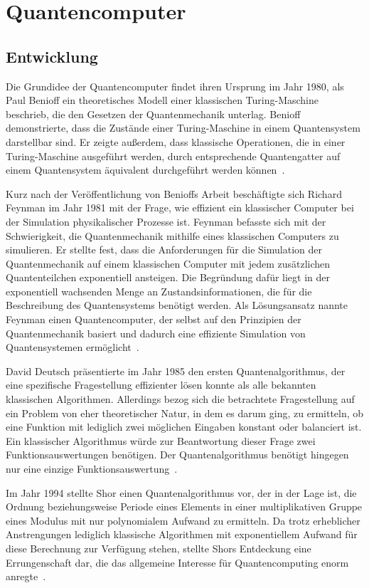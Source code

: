 \section{Quantencomputer}
\subsection{Entwicklung} 
Die Grundidee der Quantencomputer findet ihren Ursprung im Jahr 1980, 
als Paul Benioff ein theoretisches Modell einer klassischen Turing-Maschine beschrieb, 
die den Gesetzen der Quantenmechanik unterlag.
Benioff demonstrierte, dass die Zustände einer Turing-Maschine in einem Quantensystem darstellbar sind. 
Er zeigte außerdem, dass klassische Operationen, die in einer Turing-Maschine ausgeführt werden, 
durch entsprechende Quantengatter auf einem Quantensystem äquivalent durchgeführt werden können~\cite{benioff1980}.

Kurz nach der Veröffentlichung von Benioffs Arbeit beschäftigte sich Richard Feynman im Jahr 1981 mit der Frage,
wie effizient ein klassischer Computer bei der Simulation physikalischer Prozesse ist.
Feynman befasste sich mit der Schwierigkeit, die Quantenmechanik mithilfe eines klassischen Computers zu simulieren.
Er stellte fest, dass die Anforderungen für die Simulation der Quantenmechanik auf einem klassischen Computer mit jedem zusätzlichen Quantenteilchen exponentiell ansteigen.
Die Begründung dafür liegt in der exponentiell wachsenden Menge an Zustandsinformationen,
die für die Beschreibung des Quantensystems benötigt werden.
Als Lösungsansatz nannte Feynman einen Quantencomputer, 
der selbst auf den Prinzipien der Quantenmechanik basiert und dadurch eine effiziente Simulation von Quantensystemen ermöglicht~\cite{Feynman1982}.

David Deutsch präsentierte im Jahr 1985 den ersten Quantenalgorithmus, 
der eine spezifische Fragestellung effizienter lösen konnte als alle bekannten klassischen Algorithmen. 
Allerdings bezog sich die betrachtete Fragestellung auf ein Problem von eher theoretischer Natur, 
in dem es darum ging, 
zu ermitteln, ob eine Funktion mit lediglich zwei möglichen Eingaben konstant oder balanciert ist.
Ein klassischer Algorithmus würde zur Beantwortung dieser Frage zwei Funktionsauswertungen benötigen. 
Der Quantenalgorithmus benötigt hingegen
nur eine einzige Funktionsauswertung~\cite{deutsch1985}.

Im Jahr 1994 stellte Shor einen Quantenalgorithmus vor, der in der Lage ist, 
die Ordnung beziehungsweise Periode eines Elements in einer multiplikativen Gruppe eines Modulus mit nur polynomialem Aufwand zu ermitteln. 
Da trotz erheblicher Anstrengungen lediglich klassische Algorithmen mit exponentiellem Aufwand für diese Berechnung zur Verfügung stehen, 
stellte Shors Entdeckung eine Errungenschaft dar, die das allgemeine Interesse für Quantencomputing enorm anregte~\cite{Shor_1997}.

